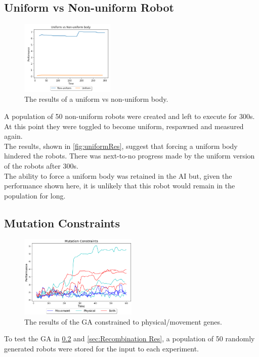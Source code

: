 \documentclass{article}
\begin{document}
\subsection{Uniform vs Non-uniform Robot}
\label{sec:Uniform Res}
\begin{figure}
    \centering
    \vspace*{-5mm}
    \includegraphics[width=0.4\textwidth]{uniformResults}
    \vspace*{-7mm}
    \caption{The results of a uniform vs non-uniform body.}
    \label{fig:uniformRes}
\end{figure}
A population of 50 non-uniform robots were created and left to execute for 300s. At this point they were toggled to become uniform, respawned and measured again. \\
The results, shown in \autoref{fig:uniformRes}, suggest that forcing a uniform body hindered the robots. There was next-to-no progress made by the uniform version of the robots after 300s. \\
The ability to force a uniform body was retained in the AI but, given the performance shown here, it is unlikely that this robot would remain in the population for long.
\\[1\baselineskip]

\subsection{Mutation Constraints}
\label{sec:Mutation Res}
\begin{figure}
    \centering
    \vspace*{-5mm}
    \includegraphics[width=0.5\textwidth]{mutationTypes}
    \vspace*{-7mm}
    \caption{The results of the GA constrained to physical/movement genes.}
\end{figure}
To test the GA in \ref{sec:Mutation Res} and \ref{sec:Recombination Res}, a population of 50 randomly generated robots were stored for the input to each experiment.\\
\end{document}
